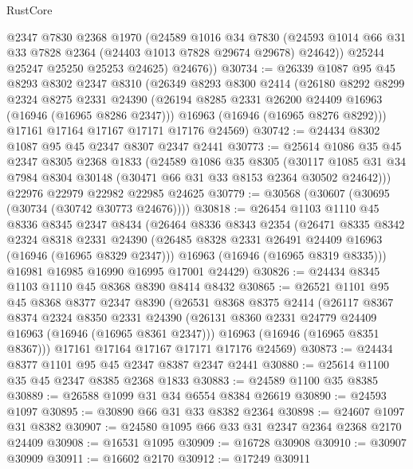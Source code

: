 \begin{lexlean}{RustCore}
\begin{coremodule}
          @2347
          @7830
          @2368
          @1970
          (@24589
            @1016
            @34
            @7830
            (@24593 @1014 @66 @31 @33 @7828 @2364 (@24403 @1013 @7828 @29674 @29678) @24642))
          @25244
          @25247
          @25250
          @25253
          @24625)
        @24676))
@30734 := @26339
    @1087
    @95
    @45
    @8293
    @8302
    @2347
    @8310
    (@26349
      @8293
      @8300
      @2414
      (@26180
        @8292
        @8299
        @2324
        @8275
        @2331
        @24390
        (@26194 @8285 @2331 @26200 @24409 @16963 (@16946 (@16965 @8286 @2347)))
        @16963
        (@16946 (@16965 @8276 @8292)))
      @17161
      @17164
      @17167
      @17171
      @17176
      @24569)
@30742 := @24434 @8302 @1087 @95 @45 @2347 @8307 @2347 @2441
@30773 := @25614
    @1086
    @35
    @45
    @2347
    @8305
    @2368
    @1833
    (@24589
      @1086
      @35
      @8305
      (@30117 @1085 @31 @34 @7984 @8304 @30148 (@30471 @66 @31 @33 @8153 @2364 @30502 @24642)))
    @22976
    @22979
    @22982
    @22985
    @24625
@30779 := @30568 (@30607 (@30695 (@30734 (@30742 @30773 @24676))))
@30818 := @26454
    @1103
    @1110
    @45
    @8336
    @8345
    @2347
    @8434
    (@26464
      @8336
      @8343
      @2354
      (@26471
        @8335
        @8342
        @2324
        @8318
        @2331
        @24390
        (@26485 @8328 @2331 @26491 @24409 @16963 (@16946 (@16965 @8329 @2347)))
        @16963
        (@16946 (@16965 @8319 @8335)))
      @16981
      @16985
      @16990
      @16995
      @17001
      @24429)
@30826 := @24434 @8345 @1103 @1110 @45 @8368 @8390 @8414 @8432
@30865 := @26521
    @1101
    @95
    @45
    @8368
    @8377
    @2347
    @8390
    (@26531
      @8368
      @8375
      @2414
      (@26117
        @8367
        @8374
        @2324
        @8350
        @2331
        @24390
        (@26131 @8360 @2331 @24779 @24409 @16963 (@16946 (@16965 @8361 @2347)))
        @16963
        (@16946 (@16965 @8351 @8367)))
      @17161
      @17164
      @17167
      @17171
      @17176
      @24569)
@30873 := @24434 @8377 @1101 @95 @45 @2347 @8387 @2347 @2441
@30880 := @25614 @1100 @35 @45 @2347 @8385 @2368 @1833
@30883 := @24589 @1100 @35 @8385
@30889 := @26588 @1099 @31 @34 @6554 @8384 @26619
@30890 := @24593 @1097
@30895 := @30890 @66 @31 @33 @8382 @2364
@30898 := @24607 @1097 @31 @8382
@30907 := @24580 @1095 @66 @33 @31 @2347 @2364 @2368 @2170 @24409
@30908 := @16531 @1095
@30909 := @16728 @30908
@30910 := @30907 @30909
@30911 := @16602 @2170
@30912 := @17249 @30911

\end{coremodule}
\end{lexlean}
